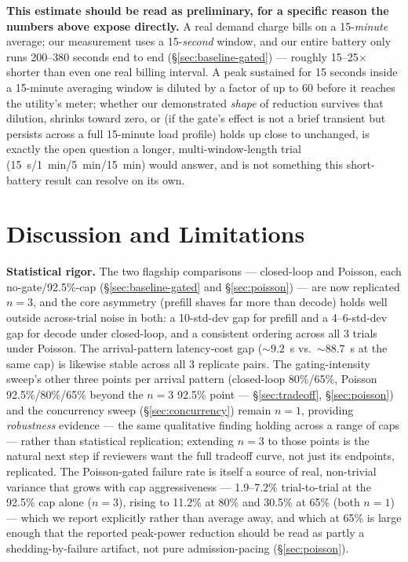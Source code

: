 \documentclass[sigconf,review,anonymous]{acmart}
\begin{document}
\textbf{This estimate should be read as preliminary, for a specific reason the numbers above
expose directly.} A real demand charge bills on a 15-\emph{minute} average; our measurement
uses a 15-\emph{second} window, and our entire battery only runs 200--380 seconds end to end
(\S\ref{sec:baseline-gated}) --- roughly 15--25$\times$ shorter than even one real billing
interval. A peak sustained for 15 seconds inside a 15-minute averaging window is diluted by a
factor of up to 60 before it reaches the utility's meter; whether our demonstrated \emph{shape}
of reduction survives that dilution, shrinks toward zero, or (if the gate's effect is not a
brief transient but persists across a full 15-minute load profile) holds up close to unchanged,
is exactly the open question a longer, multi-window-length trial (15~s/1~min/5~min/15~min)
would answer, and is not something this short-battery result can resolve on its own.

\section{Discussion and Limitations}
\label{sec:discussion}

\textbf{Statistical rigor.} The two flagship comparisons --- closed-loop and Poisson, each
no-gate/92.5\%-cap (\S\ref{sec:baseline-gated} and \S\ref{sec:poisson}) --- are now
replicated $n{=}3$, and the core asymmetry (prefill shaves far more than decode) holds well
outside across-trial noise in both: a 10-std-dev gap for prefill and a 4--6-std-dev gap for
decode under closed-loop, and a consistent ordering across all 3 trials under Poisson. The
arrival-pattern latency-cost gap (${\sim}9.2$~s vs.\ ${\sim}88.7$~s at the same cap) is
likewise stable across all 3 replicate pairs. The gating-intensity sweep's other three points
per arrival pattern (closed-loop 80\%/65\%, Poisson 92.5\%/80\%/65\% beyond the $n{=}3$
92.5\% point --- \S\ref{sec:tradeoff}, \S\ref{sec:poisson}) and the concurrency sweep
(\S\ref{sec:concurrency}) remain $n{=}1$, providing \emph{robustness} evidence --- the same
qualitative finding holding across a range of caps --- rather than statistical replication;
extending $n{=}3$ to those points is the natural next step if reviewers want the full
tradeoff curve, not just its endpoints, replicated. The Poisson-gated failure rate is itself
a source of real, non-trivial variance that grows with cap aggressiveness --- 1.9--7.2\%
trial-to-trial at the 92.5\% cap alone ($n{=}3$), rising to 11.2\% at 80\% and 30.5\% at 65\%
(both $n{=}1$) --- which we report explicitly rather than average away, and which at 65\% is
large enough that the reported peak-power reduction should be read as partly a
shedding-by-failure artifact, not pure admission-pacing (\S\ref{sec:poisson}).
\end{document}
